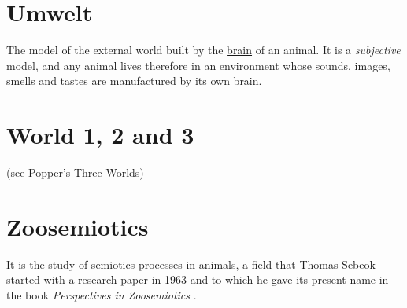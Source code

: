 \documentclass[12pt]{article}
\begin{document}
\hypertarget{umwelt}{}
\section{Umwelt}
The model of the external world built by the \hyperlink{brain}{brain} of an animal. It is a \textit{subjective} model, and any animal lives therefore in an environment whose sounds, images, smells and tastes are manufactured by its own brain.


\hypertarget{world_1_2_and_3}{}
\section{World 1, 2 and 3} (see \hyperlink{poppers_three_worlds}{Popper's Three Worlds})


\hypertarget{zoosemiotics}{}
\section{Zoosemiotics}
It is the study of semiotics processes in animals, a field that Thomas Sebeok started with a research paper in 1963 and to which he gave its present name in the book \textit{Perspectives in Zoosemiotics} \cite{sebeok72:_persp_zoosem}. 
 



\end{document}
